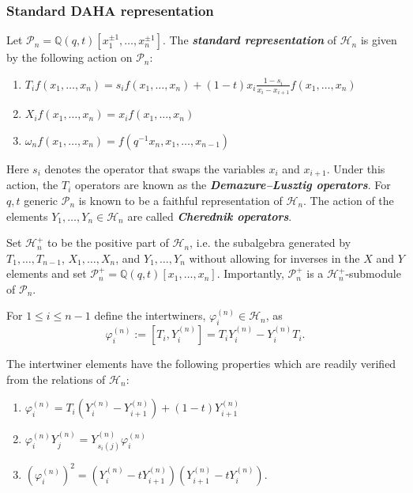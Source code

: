 \subsubsection{Standard DAHA representation}
\begin{defi} \label{defn2}
Let $\mathscr{P}_n = \mathbb{Q}(q,t)[x_1^{\pm 1},\ldots,x_n^{\pm 1}]$. The \textbf{\textit{ standard representation}} of $\mathscr{H}_n$ is given by the following action on $\mathscr{P}_n$:

\begin{center}
\begin{enumerate}
    \item $T_if(x_1,\ldots,x_n) = s_i f(x_1,\ldots,x_n) +(1-t)x_i \frac{1-s_i}{x_i-x_{i+1}}f(x_1,\ldots,x_n)$
    \item $X_if(x_1,\ldots,x_n)= x_if(x_1,\ldots,x_n)$
    \item $\omega_nf(x_1,\ldots,x_n) = f(q^{-1}x_n,x_1,\ldots,x_{n-1})$
\end{enumerate}
\end{center}

Here $s_i$ denotes the operator that swaps the variables $x_i$ and $x_{i+1}$. Under this action, the $T_i$ operators are known as the \textbf{\textit{Demazure--Lusztig operators}}. For $q,t$ generic $\mathscr{P}_n$ is known to be a faithful representation of $\mathscr{H}_n$. The action of the elements $Y_1,\ldots,Y_n \in \mathscr{H}_n$ are called \textbf{\textit{Cherednik operators}}.
\end{defi}

Set $\mathscr{H}_n^{+}$ to be the positive part of $\mathscr{H}_n$, i.e. the subalgebra generated by $T_1,\ldots,T_{n-1}$, $X_1,\ldots,X_n$, and $Y_1,\ldots,Y_n$ without allowing for inverses in the $X$ and $Y$ elements and set $\mathscr{P}_n^{+} = \mathbb{Q}(q,t)[x_1,\ldots,x_n]$. Importantly, 
$\mathscr{P}_n^{+}$ is a $\mathscr{H}_n^{+}$-submodule of $\mathscr{P}_n$. 

\begin{defi}
    For $1\leq i \leq n-1$ define the intertwiners, $\varphi_i^{(n)} \in \mathscr{H}_n$, as 
    $$\varphi_i^{(n)}:= [T_i,Y_i^{(n)}] = T_iY_i^{(n)} - Y_i^{(n)}T_i.$$
\end{defi}

The intertwiner elements have the following properties which are readily verified from the relations of $\mathscr{H}_{n}$: 
\begin{enumerate}
    \item $\varphi_i^{(n)} = T_i(Y_i^{(n)}-Y_{i+1}^{(n)}) + (1-t)Y_{i+1}^{(n)}$
    \item $\varphi_i^{(n)}Y_j^{(n)} = Y_{s_{i}(j)}^{(n)}\varphi_i^{(n)}$
    \item $(\varphi_i^{(n)})^2 = (Y_i^{(n)}-tY_{i+1}^{(n)})(Y_{i+1}^{(n)}-tY_i^{(n)}).$
\end{enumerate}


